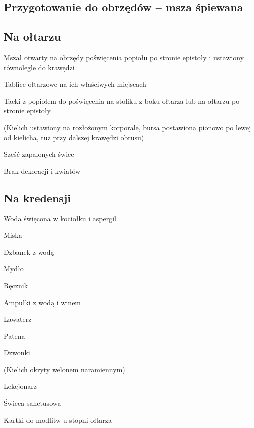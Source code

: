 \begin{paracol}{2}
	\section{Przygotowanie do obrzędów -- msza śpiewana}

	\subsection{Na ołtarzu}

	\begin{itemize*}
		\item Mszał otwarty na obrzędy poświęcenia popiołu po stronie epistoły i
		ustawiony równolegle do krawędzi
		\item Tablice ołtarzowe na ich właściwych miejscach
		\item Tacki z popiołem do poświęcenia na stoliku z boku ołtarza lub na
		ołtarzu po stronie epistoły
		\item (Kielich ustawiony na rozłożonym korporale, bursa postawiona
		      pionowo po lewej od kielicha, tuż przy dalszej krawędzi obrusu)
		\item Sześć zapalonych świec
		\item Brak dekoracji i kwiatów
	\end{itemize*}

	\subsection{Na kredensji}

	\begin{itemize*}
		\item Woda święcona w kociołku i aspergil
		\item Miska
		\item Dzbanek z wodą
		\item Mydło
		\item Ręcznik
		\item Ampułki z wodą i winem
		\item Lawaterz
		\item Patena
		\item Dzwonki
		\item (Kielich okryty welonem naramiennym)
		\item Lekcjonarz
		\item Świeca sanctusowa
		\item Kartki do modlitw u stopni ołtarza
	\end{itemize*}


\end{paracol}

